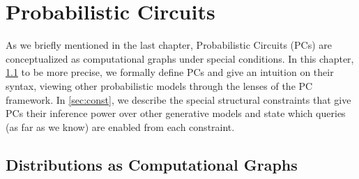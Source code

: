 \chapter{Probabilistic Circuits}
\label{ch:pc}

As we briefly mentioned in the last chapter, Probabilistic Circuits (PCs) are conceptualized as
computational graphs under special conditions. In this chapter, \cref{sec:pc} to be more precise,
we formally define PCs and give an intuition on their syntax, viewing other probabilistic models
through the lenses of the PC framework. In \cref{sec:const}, we describe the special structural
constraints that give PCs their inference power over other generative models and state which
queries (as far as we know) are enabled from each constraint.

\section{Distributions as Computational Graphs}
\label{sec:pc}

